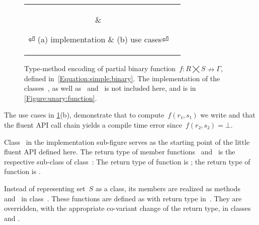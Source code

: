 \begin{figure}[hbt]
  \caption{\label{Figure:simple:binary}%
  Type-method encoding of partial binary function~$f: R⨉S↛Γ$,
  defined in~\cref{Equation:simple:binary}. The implementation of the classes~, 
  as well as~ and~ is not included here, and is
  in \cref{Figure:unary:function}.}

  \begin{tabular}{cc}
   \hspace{-2.5ex}
   \parbox[c]{0.57\linewidth}{%
   }
   &
   \hspace{-2.5ex}
   \parbox[c]{0.48\linewidth}{%
   }
⏎
   \hspace{-7ex}(a) implementation & \hspace{-5ex}(b) use cases⏎
  \end{tabular}
\end{figure}

The use cases in \cref{Figure:simple:binary}(b), demonstrate
  that to compute~$f(r₁,s₁)$ we write 
  and that the fluent API call chain  yields
  a compile time error since~$f(r₂, s₂)=⊥$.

Class~ in the implementation sub-figure serves as
  the starting point of the little fluent API defined here.
The return type of  member functions~ and~
  is the respective sub-class of class~:
The return type of function  is  ;
  the return type of function  is  .

Instead of representing set~$S$ as a class,
  its members are realized as methods~ and~ in  class~.
These functions are defined as  with return type 
  in~.
They are overridden, with the appropriate co-variant change of the return type,
  in classes  and .

